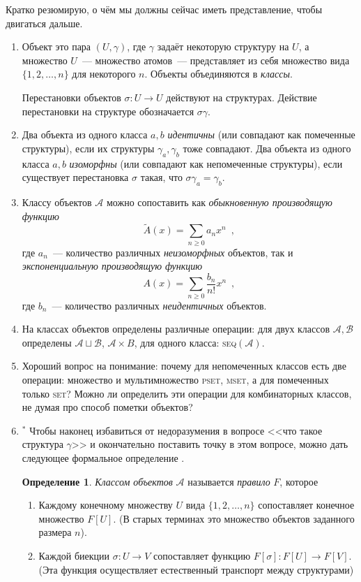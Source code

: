 \documentclass[a5paper]{article}
\theoremstyle{definition}
\newtheorem*{definition}{Определение}
\begin{document}
Кратко резюмирую, о чём мы должны сейчас иметь представление, чтобы двигаться 
дальше.
\begin{enumerate}
	\item Объект это пара \( (U, \gamma) \), где \( \gamma \) задаёт некоторую 
	структуру на \( U \), а множество \( U \)~--- множество атомов~--- 
	представляет из себя множество вида \( \{ 1,2,\ldots, n \} \) для 
	некоторого \( n \). Объекты объединяются в \textit{классы}.
	
	Перестановки объектов \( \sigma \colon U \to U \) действуют на структурах. 
	Действие перестановки на структуре обозначается \( \sigma \gamma \).
	\item Два объекта из одного класса \( a, b \) \textit{идентичны} (или 
	совпадают как помеченные структуры), если их структуры \( \gamma_a,	
	\gamma_b \) тоже совпадают. Два объекта из одного класса \( a, b \) 
	\textit{изоморфны} (или совпадают как непомеченные структуры), если 
	существует перестановка \( \sigma \) такая, что \( \sigma \gamma_a = 
	\gamma_b \).
	\item Классу объектов \( \mathcal A \) можно сопоставить как 
	\textit{обыкновенную производящую функцию}
	\[
		\widetilde A(x) = \sum_{n \geq 0} a_n x^n \enspace ,
	\]
	где \( a_n \)~--- количество различных \textit{неизоморфных} объектов, так 
	и \textit{экспоненциальную производящую функцию}
	\[
		A(x) = \sum_{n \geq 0} \dfrac{b_n}{n!} x^n \enspace ,
	\]
	где \( b_n \)~--- количество различных \textit{неидентичных} объектов.
	\item На классах объектов определены различные операции: для двух классов 
	\( \mathcal A, \mathcal B \) определены \( \mathcal A \sqcup \mathcal B \), 
	\( \mathcal A \times B \), для одного класса: \textsc{seq}\( 
	(\mathcal A) \).
	\item Хороший вопрос на понимание: почему для непомеченных классов есть две 
	операции: множество и мультимножество \textsc{pset}, \textsc{mset}, а для 
	помеченных только \textsc{set}? Можно ли определить эти операции для 
	комбинаторных классов, не думая про способ пометки объектов?
	\item\( ^{\ast} \) \footnotesize Чтобы наконец избавиться от недоразумения 
	в вопросе <<что такое структура \( \gamma \)>> и окончательно поставить 
	точку в этом вопросе, можно дать следующее формальное
	определение \cite[Definition 3, page 5]{species}. 
	\begin{definition}
	 	\textit{Классом объектов} \( \mathcal A \) называется \textit{правило} 
	 	\( F \), которое
	 	\begin{enumerate}
		 	\item Каждому конечному множеству \( U \) вида \( \{ 1, 2, \ldots, 
		 	n \} \) сопоставляет конечное множество \( F[U] \). (В старых 
		 	терминах это множество объектов заданного размера \( n \)).
		 	\item Каждой биекции \( \sigma \colon U \to V \) сопоставляет 
		 	функцию \( F[\sigma] \colon F[U] \to F[V] \). (Эта функция 
		 	осуществляет естественный транспорт между структурами)
		 	

\end{enumerate}
\end{definition}
\end{enumerate}
\end{document}
